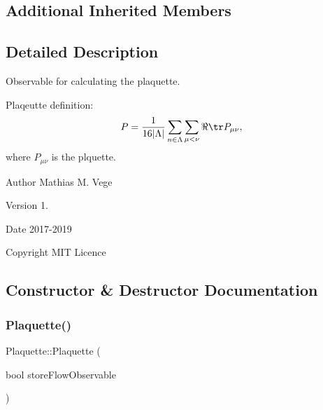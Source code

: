 \subsection*{Additional Inherited Members}


\subsection{Detailed Description}
Observable for calculating the plaquette. 

Plaqeutte definition\+: \[ P = \frac{1}{16|\Lambda|} \sum_{n\in\Lambda} \sum_{\mu < \nu} \Re \tr P_{\mu\nu}, \] where $P_{\mu\nu}$ is the plquette.

\begin{DoxyAuthor}{Author}
Mathias M. Vege 
\end{DoxyAuthor}
\begin{DoxyVersion}{Version}
1. 
\end{DoxyVersion}
\begin{DoxyDate}{Date}
2017-\/2019 
\end{DoxyDate}
\begin{DoxyCopyright}{Copyright}
M\+IT Licence 
\end{DoxyCopyright}


\subsection{Constructor \& Destructor Documentation}
\mbox{\label{class_plaquette_a1c87b43fc7ee74b2b0289de63e03bb61}} 
\subsubsection{\texorpdfstring{Plaquette()}{Plaquette()}}
{\footnotesize\ttfamily Plaquette\+::\+Plaquette (\begin{DoxyParamCaption}\item[{bool}]{store\+Flow\+Observable }\end{DoxyParamCaption})}

